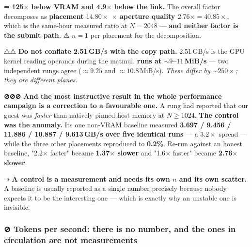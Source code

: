 \documentclass[10.5pt]{article}
\begin{document}
⇒ \textbf{125$\times$ below VRAM and 4.9$\times$ below the link.} The overall factor decomposes as
\textbf{placement $14.80\times$ $\times$ aperture quality $2.76\times = 40.85\times$}, which is the
same-hour measured ratio at $N=2048$ — \textbf{and neither factor is the submit path.} ⚠ $n=1$ per
placement for the decomposition.

⚠⚠ \textbf{Do not conflate 2.51\,GB/s with the copy path.} 2.51\,GB/s is the GPU kernel reading
operands during the matmul. \textbf{ runs at ${\sim}9$--$11$\,MiB/s} — two
independent rungs agree ($\approx 9.25$ and $\approx 10.8$\,MiB/s). \emph{These differ by
${\sim}250\times$; they are different planes.}

\begin{warnbox}\small
\textbf{⊘⊘⊘ And the most instructive result in the whole performance campaign is a correction to
a favourable one.} A rung had reported that our guest was \emph{faster} than natively pinned host
memory at $N \geq 1024$. \textbf{The control was the anomaly.} Its one non-VRAM baseline measured
\textbf{3.697 / 9.456 / 11.886 / 10.887 / 9.613\,GB/s over five identical runs} — a $3.2\times$
spread — while the three other placements reproduced to \textbf{0.2\%}. Re-run against an honest
baseline, "2.2$\times$ faster" became \textbf{1.37$\times$ slower} and "1.6$\times$ faster" became
\textbf{2.76$\times$ slower}.

\smallskip
⇒ \textbf{A control is a measurement and needs its own $n$ and its own scatter.} A baseline is
usually reported as a single number precisely because nobody expects it to be the interesting
one — which is exactly why an unstable one is invisible.
\end{warnbox}

\subsubsection*{⊘ Tokens per second: there is no number, and the ones in circulation are not measurements}
\end{document}
